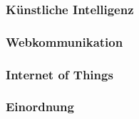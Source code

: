 \subsubsection{Künstliche Intelligenz}


\subsubsection{Webkommunikation}


\subsubsection{Internet of Things}


\subsubsection{Einordnung}

